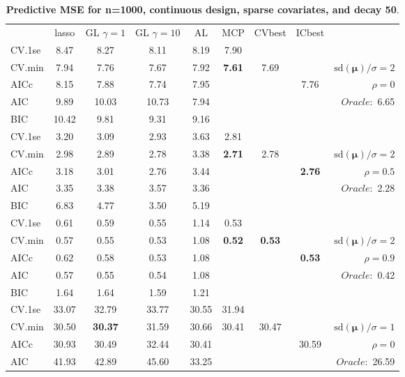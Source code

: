 \begin{table}\vspace{-.5cm}
\caption[l]{ { \bf Predictive MSE for n=1000, continuous design, 
sparse covariates, and  decay  50}.}
\vspace{-.5cm}
\footnotesize{}
\begin{center}
\begin{tabular}{l*{7}{c}|r}
 & lasso & GL $\gamma=1$ & GL $\gamma=10$ & AL & MCP  & CVbest & ICbest  \\
\cline{1-9}
CV.1se & 8.47 & 8.27 & 8.11 & 8.19 & 7.90 & & & \\
CV.min & 7.94 & 7.76 & 7.67 & 7.92 & {\bf 7.61} & 7.69 & & $\mathrm{sd}(\mathbf{\mu})/\sigma=2$ \\
AICc & 8.15 & 7.88 & 7.74 & 7.95 & & & 7.76 &  $\rho=0$ \\
AIC & 9.89 & 10.03 & 10.73 & 7.94 & & & &  \multirow{2}{*}{$Oracle: $ 6.65} \\
BIC & 10.42 & 9.81 & 9.31 & 9.16 & & & &  \\
 \hline 
CV.1se & 3.20 & 3.09 & 2.93 & 3.63 & 2.81 & & & \\
CV.min & 2.98 & 2.89 & 2.78 & 3.38 & {\bf 2.71} & 2.78 & & $\mathrm{sd}(\mathbf{\mu})/\sigma=2$ \\
AICc & 3.18 & 3.01 & 2.76 & 3.44 & & & {\bf 2.76} &  $\rho=0.5$ \\
AIC & 3.35 & 3.38 & 3.57 & 3.36 & & & &  \multirow{2}{*}{$Oracle: $ 2.28} \\
BIC & 6.83 & 4.77 & 3.50 & 5.19 & & & &  \\
 \hline 
CV.1se & 0.61 & 0.59 & 0.55 & 1.14 & 0.53 & & & \\
CV.min & 0.57 & 0.55 & 0.53 & 1.08 & {\bf 0.52} & {\bf 0.53} & & $\mathrm{sd}(\mathbf{\mu})/\sigma=2$ \\
AICc & 0.62 & 0.58 & 0.53 & 1.08 & & & {\bf 0.53} &  $\rho=0.9$ \\
AIC & 0.57 & 0.55 & 0.54 & 1.08 & & & &  \multirow{2}{*}{$Oracle: $ 0.42} \\
BIC & 1.64 & 1.64 & 1.59 & 1.21 & & & &  \\
 \hline 
CV.1se & 33.07 & 32.79 & 33.77 & 30.55 & 31.94 & & & \\
CV.min & 30.50 & {\bf 30.37} & 31.59 & 30.66 & 30.41 & 30.47 & & $\mathrm{sd}(\mathbf{\mu})/\sigma=1$ \\
AICc & 30.93 & 30.49 & 32.44 & 30.41 & & & 30.59 &  $\rho=0$ \\
AIC & 41.93 & 42.89 & 45.60 & 33.25 & & & &  \multirow{2}{*}{$Oracle: $ 26.59} \\

\end{tabular}
\end{center}
\end{table}
